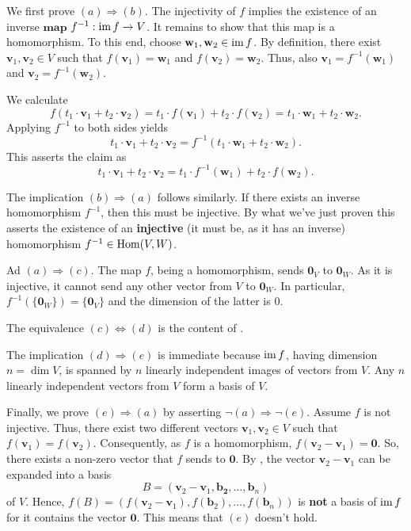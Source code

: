 \begin{corproof}
 We first prove $(a) \Rightarrow (b)$. The injectivity of $f$ implies the
 existence of an inverse $\mathbf{map}$ $f^{-1}: \operatorname{im} f \to V$. It remains to
 show that this map is a homomorphism. To this end, choose
 $\mathbf{w}_1,\mathbf{w}_2 \in \operatorname{im} f$. By definition, there exist
 $\mathbf{v}_1,\mathbf{v}_2 \in V$ such that $f(\mathbf{v}_1) = \mathbf{w}_1$
 and $f(\mathbf{v}_2) = \mathbf{w}_2$. Thus, also $\mathbf{v}_1 =
 f^{-1}(\mathbf{w}_1)$ and $\mathbf{v}_2 = f^{-1}(\mathbf{w}_2)$.
 
 We calculate
 \[
  f(t_1 \cdot \mathbf{v}_1 + t_2 \cdot \mathbf{v}_2) = t_1 \cdot f(\mathbf{v}_1)
  + t_2 \cdot f(\mathbf{v}_2) = t_1 \cdot \mathbf{w}_1 + t_2 \cdot \mathbf{w}_2.
 \]
 Applying $f^{-1}$ to both sides yields
 \[
  t_1 \cdot \mathbf{v}_1 + t_2 \cdot \mathbf{v}_2 = f^{-1}(t_1 \cdot
  \mathbf{w}_1 + t_2 \cdot \mathbf{w}_2).
 \]
 This asserts the claim as
 \[
  t_1 \cdot \mathbf{v}_1 + t_2 \cdot \mathbf{v}_2 = t_1 \cdot
  f^{-1}(\mathbf{w}_1) + t_2 \cdot f(\mathbf{w}_2).
 \]

 The implication $(b) \Rightarrow (a)$ follows similarly. If there exists an
 inverse homomorphism $f^{-1}$, then this must be injective. By what we've just
 proven this asserts the existence of an \textbf{injective} (it must be, as it
 has an inverse) homomorphism $f^{-1} \in \operatorname{Hom}(V,W)$.

 Ad $(a) \Rightarrow (c)$. The map $f$, being a homomorphism, sends
 $\mathbf{0}_V$ to $\mathbf{0}_W$. As it is injective, it cannot send any other
 vector from $V$ to $\mathbf{0}_W$. In particular, $f^{-1}(\{\mathbf{0}_W\}) =
 \{\mathbf{0}_V\}$ and the dimension of the latter is $0$.

 The equivalence $(c) \Leftrightarrow (d)$ is the content of
 .

 The implication $(d) \Rightarrow (e)$ is immediate because $\operatorname{im} f$, having
 dimension $n = \dim V$, is spanned by $n$ linearly independent images of
 vectors from $V$. Any $n$ linearly independent vectors from $V$ form a basis of
 $V$.

 Finally, we prove $(e) \Rightarrow (a)$ by asserting $\neg (a) \Rightarrow \neg
 (e)$. Assume $f$ is not injective. Thus, there exist two different vectors
 $\mathbf{v}_1,\mathbf{v}_2 \in V$ such that $f(\mathbf{v}_1) =
 f(\mathbf{v}_2)$. Consequently, as $f$ is a homomorphism, $f(\mathbf{v}_2 -
 \mathbf{v}_1) = \mathbf{0}$. So, there exists a non-zero vector that $f$ sends
 to $\mathbf{0}$. By , the vector
 $\mathbf{v}_2-\mathbf{v}_1$ can be expanded into a basis
 \[
  B = (\mathbf{v}_2-\mathbf{v}_1,\mathbf{b_2},\ldots,\mathbf{b}_n)
 \]
 of $V$. Hence, $f(B) = (f(\mathbf{v}_2 -
 \mathbf{v}_1),f(\mathbf{b}_2),\ldots,f(\mathbf{b}_n))$ is \textbf{not} a basis
 of $\operatorname{im} f$ for it contains the vector $\mathbf{0}$. This means that $(e)$
 doesn't hold.
\end{corproof}
